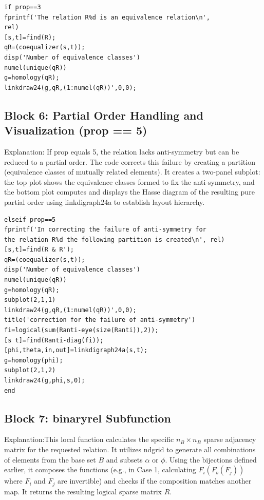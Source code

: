  \begin{lstlisting}
if prop==3
fprintf('The relation R%d is an equivalence relation\n',
rel)    
[s,t]=find(R);
qR=(coequalizer(s,t));
disp('Number of equivalence classes')
numel(unique(qR))   
g=homology(qR);
linkdraw24(g,qR,(1:numel(qR))',0,0);
\end{lstlisting}


\subsection*{\hspace*{0.2cm} Block 6: Partial Order Handling and Visualization (prop == 5)}
Explanation:
If prop equals 5, the relation lacks anti-symmetry but can be reduced to a partial order. The code corrects this failure by creating a partition (equivalence classes of mutually related elements). It creates a two-panel subplot: the top plot shows the equivalence classes formed to fix the anti-symmetry, and the bottom plot computes and displays the Hasse diagram of the resulting pure partial order using linkdigraph24a to establish layout hierarchy.

\begin{lstlisting}
elseif prop==5
fprintf('In correcting the failure of anti-symmetry for 
the relation R%d the following partition is created\n', rel)
[s,t]=find(R & R');
qR=(coequalizer(s,t));
disp('Number of equivalence classes')
numel(unique(qR))   
g=homology(qR);
subplot(2,1,1)
linkdraw24(g,qR,(1:numel(qR))',0,0);
title('correction for the failure of anti-symmetry')
fi=logical(sum(Ranti-eye(size(Ranti)),2));
[s t]=find(Ranti-diag(fi));
[phi,theta,in,out]=linkdigraph24a(s,t);
g=homology(phi);
subplot(2,1,2)
linkdraw24(g,phi,s,0);
end
\end{lstlisting}

\subsection*{\hspace*{0.2cm} Block 7: binaryrel Subfunction}
Explanation:This local function calculates the specific $n_B \times n_B$ sparse adjacency matrix for the requested relation. It utilizes ndgrid to generate all combinations of elements from the base set $B$ and subsets $\alpha$ or $\phi$. Using the bijections defined earlier, it composes the functions (e.g., in Case 1, calculating $F_i(F_b(F_j))$ where $F_i$ and $F_j$ are invertible) and checks if the composition matches another map. It returns the resulting logical sparse matrix $R$.

